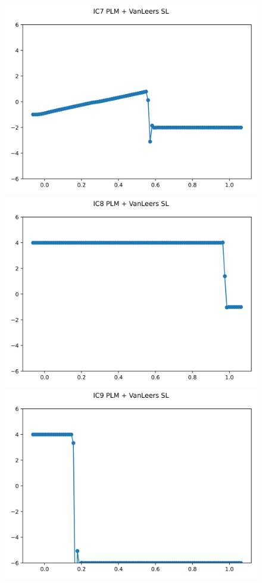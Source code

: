 \documentclass{article}
\begin{document}
\begin{figure}[t]
    \emp
        \centering
        \includegraphics[width=.95\textwidth]{../../code/hires_IC7Methodpv_plot.png}
        \includegraphics[width=.95\textwidth]{../../code/hires_IC8Methodpv_plot.png}
        \includegraphics[width=.95\textwidth]{../../code/hires_IC9Methodpv_plot.png}

\end{figure}
\end{document}

